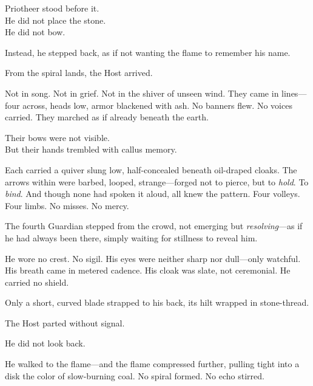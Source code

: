 \documentclass[12pt]{article}
\begin{document}
\vspace{0.5em}
Priotheer stood before it.\\
He did not place the stone.\\
He did not bow.

\vspace{0.5em}
Instead, he stepped back, as if not wanting the flame to remember his name.

\vspace{0.5em}
From the spiral lands, the Host arrived.

\vspace{0.5em}
Not in song. Not in grief. Not in the shiver of unseen wind. They came in lines---four across, heads low, armor blackened with ash. No banners flew. No voices carried. They marched as if already beneath the earth.

\vspace{0.5em}
Their bows were not visible.\\
But their hands trembled with callus memory.

\vspace{0.5em}
Each carried a quiver slung low, half-concealed beneath oil-draped cloaks. The arrows within were barbed, looped, strange---forged not to pierce, but to \textit{hold}. To \textit{bind}. And though none had spoken it aloud, all knew the pattern. Four volleys. Four limbs. No misses. No mercy.

\vspace{0.5em}
The fourth Guardian stepped from the crowd, not emerging but \textit{resolving}---as if he had always been there, simply waiting for stillness to reveal him.

\vspace{0.5em}
He wore no crest. No sigil. His eyes were neither sharp nor dull---only watchful. His breath came in metered cadence. His cloak was slate, not ceremonial. He carried no shield.

\vspace{0.5em}
Only a short, curved blade strapped to his back, its hilt wrapped in stone-thread.

\vspace{0.5em}
The Host parted without signal.

\vspace{0.5em}
He did not look back.

\vspace{0.5em}
He walked to the flame---and the flame compressed further, pulling tight into a disk the color of slow-burning coal. No spiral formed. No echo stirred.
\end{document}
